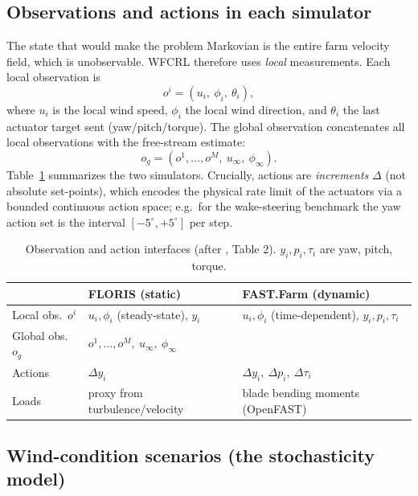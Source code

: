 \documentclass[11pt]{article}
\theoremstyle{plain}
\theoremstyle{definition}
\newcommand{\wind}{u_{\infty}}
\newcommand{\dir}{\phi_{\infty}}
\begin{document}
\subsection{Observations and actions in each simulator}

The state that would make the problem Markovian is the entire farm velocity
field, which is unobservable. WFCRL therefore uses \emph{local} measurements.
Each local observation is
\begin{equation}
  o^i = (u_i,\ \phi_i,\ \theta_i),
\end{equation}
where $u_i$ is the local wind speed, $\phi_i$ the local wind direction, and
$\theta_i$ the last actuator target sent (yaw/pitch/torque). The global
observation concatenates all local observations with the free-stream estimate:
\begin{equation}
  o_g = (o^1,\dots,o^M,\ \wind,\ \dir).
\end{equation}
Table~\ref{tab:obsact} summarizes the two simulators. Crucially, actions are
\emph{increments} $\Delta$ (not absolute set-points), which encodes the
physical rate limit of the actuators via a bounded continuous action space;
e.g.\ for the wake-steering benchmark the yaw action set is the interval
$[-5^\circ,+5^\circ]$ per step.

\begin{table}[h]
\centering
\begin{tabular}{@{}lll@{}}
\toprule
 & \textbf{FLORIS (static)} & \textbf{FAST.Farm (dynamic)} \\
\midrule
Local obs.\ $o^i$ & $u_i,\phi_i$ (steady-state), $y_i$ &
  $u_i,\phi_i$ (time-dependent), $y_i,p_i,\tau_i$ \\
Global obs.\ $o_g$ & \multicolumn{2}{l}{$o^1,\dots,o^M,\ \wind,\ \dir$} \\
Actions & $\Delta y_i$ & $\Delta y_i,\ \Delta p_i,\ \Delta \tau_i$ \\
Loads & proxy from turbulence/velocity & blade bending moments (OpenFAST) \\
\bottomrule
\end{tabular}
\caption{Observation and action interfaces (after \cite{P1}, Table 2).
$y_i,p_i,\tau_i$ are yaw, pitch, torque.}
\label{tab:obsact}
\end{table}

\subsection{Wind-condition scenarios (the stochasticity model)}
\end{document}
